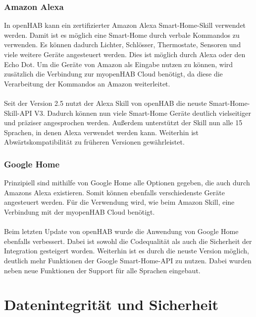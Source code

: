 \subsubsection{Amazon Alexa}
In openHAB kann ein zertifizierter Amazon Alexa Smart-Home-Skill verwendet werden. Damit ist es möglich eine Smart-Home durch verbale Kommandos zu verwenden. Es können dadurch Lichter, Schlösser, Thermostate, Sensoren und viele weitere Geräte angesteuert werden. Dies ist möglich durch Alexa oder den Echo Dot.\cite{ALEXA01:AL}\cite{ALEXA02:AL}
Um die Geräte von Amazon als Eingabe nutzen zu können, wird zusätzlich die Verbindung zur myopenHAB Cloud benötigt, da diese die Verarbeitung der Kommandos an Amazon weiterleitet.\\
\\
Seit der Version 2.5 nutzt der Alexa Skill von openHAB die neuste Smart-Home-Skill-API V3. Dadurch können nun viele Smart-Home Geräte deutlich vielseitiger und präziser angesprochen werden. Außerdem unterstützt der Skill nun alle 15 Sprachen, in denen Alexa verwendet werden kann. Weiterhin ist Abwärtskompatibilität zu früheren Versionen gewährleistet.\cite{openHAB02:OH}

\subsubsection{Google Home}

Prinzipiell sind mithilfe von Google Home alle Optionen gegeben, die auch durch Amazons Alexa existieren. Somit können ebenfalls verschiedenste Geräte angesteuert werden. Für die Verwendung wird, wie beim Amazon Skill, eine Verbindung mit der myopenHAB Cloud benötigt.\\
\\
Beim letzten Update von openHAB wurde die Anwendung von Google Home ebenfalls verbessert. Dabei ist sowohl die Codequalität als auch die Sicherheit der Integration gesteigert worden. Weiterhin ist es durch die neuste Version möglich, deutlich mehr Funktionen der Google Smart-Home-API zu nutzen. Dabei wurden neben neue Funktionen der Support für alle Sprachen eingebaut.\cite{openHAB02:OH}\cite{GOOGLEH01:GH}

\section{Datenintegrität und Sicherheit}

